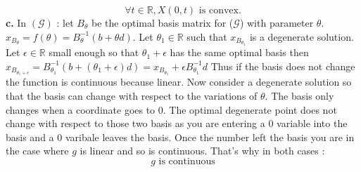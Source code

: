 \documentclass{article}
\begin{document}

$$\boxed{\forall t\in\mathbb{R}, X(0,t)\text{ is convex.}}$$
\textbf{c.} In $(\mathcal{G})$ : let $B_\theta$ be the optimal basis matrix for ($\mathcal{G}$) with parameter $\theta$. $x_{B_\theta} = f(\theta) = B_\theta^{-1}(b+\theta d)$. Let $\theta_1\in\mathbb{R}$ such that $x_{B_{\theta_1}}$ is a degenerate solution. Let $\epsilon\in\mathbb{R}$ small enough so that $\theta_1+\epsilon$ has the same optimal basis then 
$x_{B_{\theta_1+\epsilon}} = B_{\theta_1}^{-1}(b+(\theta_1+\epsilon)d) = x_{B_{\theta_1}} +\epsilon B_{\theta_1}^{-1}d$ 
Thus if the basis does not change the function is continuous because linear. Now consider a degenerate solution so that the basis can change with respect to the variations of $\theta$. The basis only changes when a coordinate goes to 0. The optimal degenerate point does not change with respect to those two basis as you are entering a 0 variable into the basis and a 0 varibale leaves the basis. Once the number left the basis you are in the case where $g$ is linear and so is continuous. That's why in both cases :
$$\boxed{g \text{ is continuous}}$$
\newpage
\end{document}
